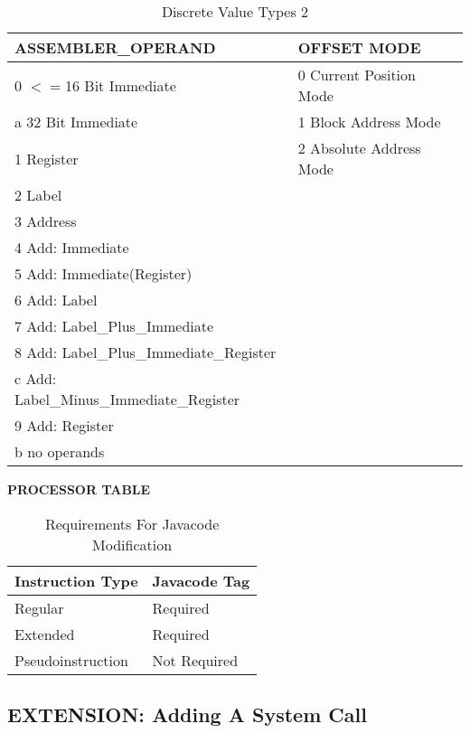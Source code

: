 \begin{table}
\begin{center}
{\footnotesize
	\begin{tabular}{|l|l|}
	\hline
	ASSEMBLER\_OPERAND	&	OFFSET MODE \\
	\hline
	0 $<=$16 Bit Immediate	&	0 Current Position Mode \\
	a 32 Bit Immediate		&	1 Block Address Mode \\
	1 Register				&	2 Absolute Address Mode \\
	2 Label					&	\\
	3 Address				&	\\
	4 Add: Immediate		&	\\
	5 Add: Immediate(Register)	&	\\
	6 Add: Label			&	\\
	7 Add: Label\_Plus\_Immediate				&	\\
	8 Add: Label\_Plus\_Immediate\_Register		&	\\
	c Add: Label\_Minus\_Immediate\_Register	&	\\
	9 Add: Register			&	\\
	b no operands			&	\\
	\hline
	\end{tabular}
}
\caption{Discrete Value Types 2}
\label{tab:Discrete2}
\end{center}
\end{table}


\textbf{PROCESSOR TABLE}


\begin{table}[]
\begin{center}
	\begin{tabular}{|l|l|}
	\hline
	Instruction Type	&	Javacode Tag	\\
	\hline
	Regular				&	Required		\\
	Extended			&	Required		\\
	Pseudoinstruction	&	Not Required	\\
	\hline
	\end{tabular}
\caption{Requirements For Javacode Modification}
\end{center}
\end{table}





\subsection{EXTENSION: Adding A System Call}

